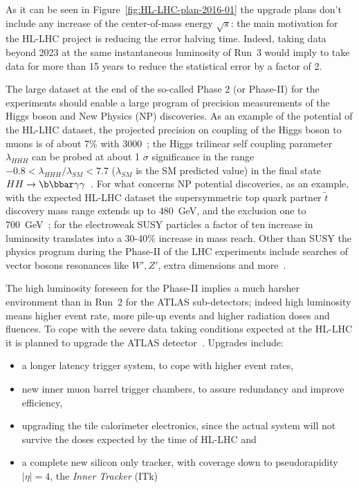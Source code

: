 As it can be seen in Figure~\ref{fig:HL-LHC-plan-2016-01} the upgrade plans don't include any increase 
of the center-of-mass energy $\sqrt{s}$: the main motivation for the HL-LHC project is 
reducing the error halving time. Indeed, taking data beyond 2023 at the same instantaneous luminosity of 
Run~3 would imply  to take data for more than 15 years to reduce the statistical error by a factor of 2.

The large dataset at the end of the so-called Phase 2 (or {\it} Phase-II) for the experiments should enable 
a  large program of precision measurements of the Higgs boson and New Physics (NP) discoveries. 
As an example of the potential of the HL-LHC dataset, the projected precision on coupling of the Higgs
 boson to muons is of about 7\% with  3000~\invfb; the Higgs 
trilinear self coupling parameter $\lambda_{HHH}$ can be probed at about 1 $\sigma$ significance 
in the range $-0.8<\lambda_{HHH}/\lambda_{SM}<7.7$ ($\lambda_{SM}$ is the SM predicted value) 
in the final state $HH\to\b\bbar\gamma\gamma$~\cite{ATL-PHYS-PUB-2014-016}. 
For what concerns NP potential discoveries, as an example, with the expected HL-LHC dataset the 
supersymmetric top quark partner $\widetilde{t}$ discovery mass range extends up to 480~GeV, and the exclusion one to 700~GeV~\cite{ATL-PHYS-PUB-2016-022};
for the electroweak SUSY particles a factor of ten increase in luminosity translates into a 30-40\% increase in mass reach. Other than SUSY the physics program 
during the Phase-II of the LHC experiments include searches of   vector bosons resonances like 
$W',Z'$, 
extra dimensions and more~\cite{ATLASLoIPhaseII}.

The high luminosity foreseen for the Phase-II implies a much harsher environment than in Run~2 
for the ATLAS sub-detectors; indeed high luminosity means higher event rate, more pile-up events 
and higher radiation doses and fluences. 
To cope with the severe data taking conditions expected at the HL-LHC it is planned to 
upgrade the  ATLAS detector~\cite{ATLASLoIPhaseII,ATLASITkScopingDocument}. Upgrades include:

\begin{itemize}
\item a longer latency trigger system, to cope with higher event rates,
\item new inner muon barrel trigger chambers, to assure redundancy and improve efficiency,
\item upgrading the tile calorimeter electronics, since the actual system will not survive the doses expected by the time of HL-LHC and
\item a complete new silicon only tracker, with coverage down to pseudorapidity $|\eta|=4$, the {\it Inner Tracker} (ITk)
\end{itemize} 

